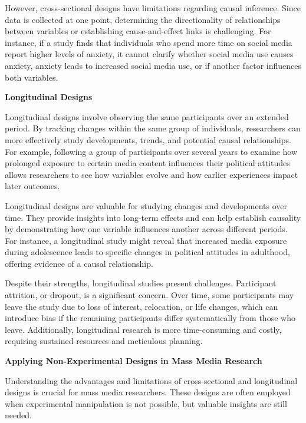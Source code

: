 \documentclass[
]{book}
\begin{document}
However, cross-sectional designs have limitations regarding causal inference. Since data is collected at one point, determining the directionality of relationships between variables or establishing cause-and-effect links is challenging. For instance, if a study finds that individuals who spend more time on social media report higher levels of anxiety, it cannot clarify whether social media use causes anxiety, anxiety leads to increased social media use, or if another factor influences both variables.

\textbf{Longitudinal Designs}

Longitudinal designs involve observing the same participants over an extended period. By tracking changes within the same group of individuals, researchers can more effectively study developments, trends, and potential causal relationships. For example, following a group of participants over several years to examine how prolonged exposure to certain media content influences their political attitudes allows researchers to see how variables evolve and how earlier experiences impact later outcomes.

Longitudinal designs are valuable for studying changes and developments over time. They provide insights into long-term effects and can help establish causality by demonstrating how one variable influences another across different periods. For instance, a longitudinal study might reveal that increased media exposure during adolescence leads to specific changes in political attitudes in adulthood, offering evidence of a causal relationship.

Despite their strengths, longitudinal studies present challenges. Participant attrition, or dropout, is a significant concern. Over time, some participants may leave the study due to loss of interest, relocation, or life changes, which can introduce bias if the remaining participants differ systematically from those who leave. Additionally, longitudinal research is more time-consuming and costly, requiring sustained resources and meticulous planning.

\textbf{Applying Non-Experimental Designs in Mass Media Research}

Understanding the advantages and limitations of cross-sectional and longitudinal designs is crucial for mass media researchers. These designs are often employed when experimental manipulation is not possible, but valuable insights are still needed.
\end{document}
